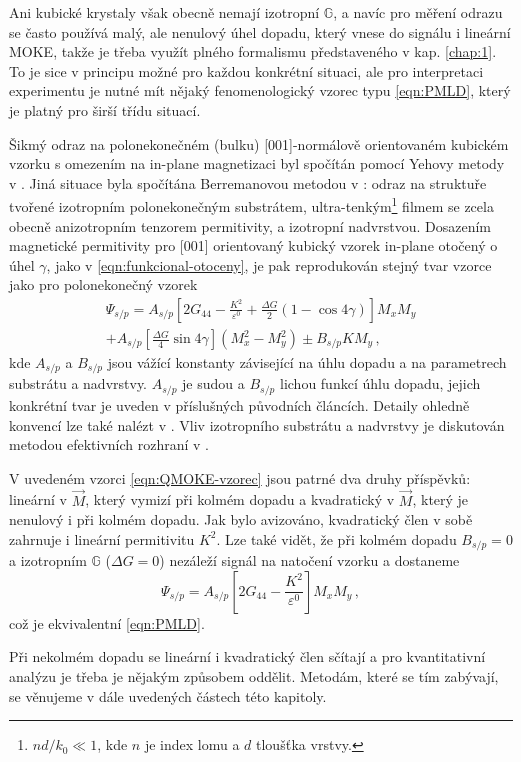 Ani kubické krystaly však obecně nemají izotropní $\mathbb{G}$\cite{hamrlovaQuadraticinmagnetizationPermittivityConductivity2013}, a navíc pro měření odrazu se často používá malý, ale nenulový úhel dopadu, který vnese do signálu i lineární MOKE, takže je třeba využít plného formalismu představeného v kap. \ref{chap:1}.
To je sice v principu možné pro každou konkrétní situaci, ale pro interpretaci experimentu je nutné mít nějaký fenomenologický vzorec typu \eqref{eqn:PMLD}, který je platný pro širší třídu situací.

Šikmý odraz na polonekonečném (bulku) [001]-normálově orientovaném kubickém vzorku s omezením na in-plane magnetizaci byl spočítán pomocí Yehovy metody v \cite{postavaAnisotropyQuadraticMagnetooptic2002}.
Jiná situace byla spočítána Berremanovou metodou v \cite{hamrleVicinalInterfaceSensitive2003}: odraz na struktuře tvořené izotropním polonekonečným substrátem,
ultra-tenkým\footnote{$nd/k_0 \ll 1$, kde $n$ je index lomu a $d$ tloušťka vrstvy.}
filmem se zcela obecně anizotropním tenzorem permitivity, a izotropní nadvrstvou.
Dosazením magnetické permitivity pro [001] orientovaný kubický vzorek in-plane otočený o úhel $\gamma$, jako v \eqref{eqn:funkcional-otoceny}, je pak reprodukován stejný tvar vzorce jako pro polonekonečný vzorek
\begin{multline} 
\label{eqn:QMOKE-vzorec}
    \Psi_{s/p}=
     A_{s/p} \left[ 2G_{44}-\frac{K^2}{\varepsilon^0}+\frac{\Delta G}{2}(1-\cos 4\gamma)  \right] M_x M_y\\
     + A_{s/p} \left[ \frac{\Delta G}{4}\sin 4\gamma  \right] \left(M_x^2-M_y^2\right) \pm B_{s/p} K M_y \,,
\end{multline}
kde $A_{s/p}$ a $B_{s/p}$ jsou vážící konstanty závisející na úhlu dopadu a na parametrech substrátu a nadvrstvy. 
$A_{s/p}$ je sudou a $B_{s/p}$ lichou funkcí úhlu dopadu, jejich konkrétní tvar je uveden v příslušných původních článcích\cite{postavaAnisotropyQuadraticMagnetooptic2002,hamrleVicinalInterfaceSensitive2003}.
Detaily ohledně konvencí lze také nalézt v \cite{silberQuadraticMagnetoopticKerr2019a}.
Vliv izotropního substrátu a nadvrstvy je diskutován metodou efektivních rozhraní v \cite{visnovskyPolarMagnetoopticsSimple1995}. 

V uvedeném vzorci \eqref{eqn:QMOKE-vzorec} jsou patrné dva druhy příspěvků: lineární v $\vec{M}$, který vymizí při kolmém dopadu a kvadratický v $\vec{M}$, který je nenulový i při kolmém dopadu.
Jak bylo avizováno, kvadratický člen v sobě zahrnuje i lineární permitivitu $K^2$.
Lze také vidět, že při kolmém dopadu $B_{s/p}=0$ a izotropním $\mathbb{G}$ ($\Delta G=0$) nezáleží signál na natočení vzorku a dostaneme
\begin{equation}
    \Psi_{s/p}=A_{s/p} \left[ 2G_{44}-\frac{K^2}{\varepsilon^0}  \right] M_x M_y \,,
\end{equation}
což je ekvivalentní \eqref{eqn:PMLD}.

Při nekolmém dopadu se lineární i kvadratický člen sčítají a pro kvantitativní analýzu je třeba je nějakým způsobem oddělit.
Metodám, které se tím zabývají, se věnujeme v dále uvedených částech této kapitoly.
